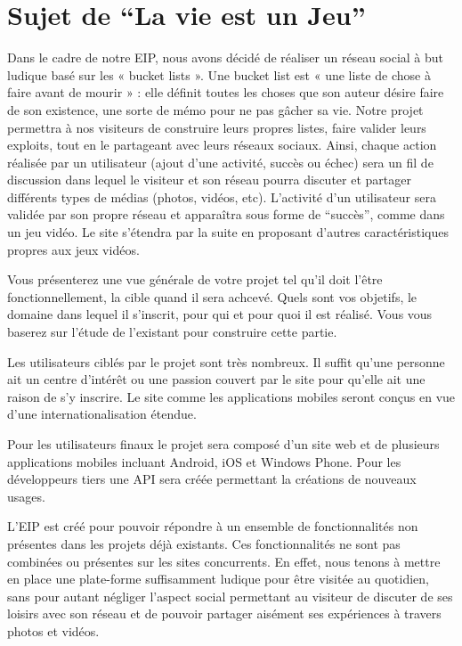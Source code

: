 \documentclass{life-fr}
\begin{document}
\section{Sujet de ``La vie est un Jeu''}
Dans le cadre de notre EIP, nous avons décidé de réaliser un réseau social à but ludique basé sur les « bucket lists ». Une bucket list est « une liste de chose à faire avant de mourir » : elle définit toutes les choses que son auteur désire faire de son existence, une sorte de mémo pour ne pas gâcher sa vie. Notre projet permettra à nos visiteurs de construire leurs propres listes, faire valider leurs exploits, tout en le partageant avec leurs réseaux sociaux. Ainsi, chaque action réalisée par un utilisateur (ajout d'une activité, succès ou échec) sera un fil de discussion dans lequel le visiteur et son réseau pourra discuter et partager différents types de médias (photos, vidéos, etc). L'activité d'un utilisateur sera validée par son propre réseau et apparaîtra sous forme de “succès”, comme dans un jeu vidéo. Le site s'étendra par la suite en proposant d'autres caractéristiques propres aux jeux vidéos.

Vous présenterez une vue générale de votre projet tel qu’il doit l’être fonctionnellement, la cible quand il sera achcevé. Quels sont vos objetifs, le domaine dans lequel il s’inscrit, pour qui et pour quoi il est réalisé. Vous vous baserez sur l’étude de l’existant pour construire cette partie.

Les utilisateurs ciblés par le projet sont très nombreux. Il suffit qu'une personne ait un centre d'intérêt ou une passion couvert par le site pour qu'elle ait une raison de s'y inscrire. Le site comme les applications mobiles seront conçus en vue d'une internationalisation étendue.

Pour les utilisateurs finaux le projet sera composé d'un site web et de plusieurs applications mobiles incluant Android, iOS et Windows Phone. Pour les développeurs tiers une API sera créée permettant la créations de nouveaux usages.

L'EIP est créé pour pouvoir répondre à un ensemble de fonctionnalités non présentes dans les projets déjà existants. Ces fonctionnalités ne sont pas combinées ou présentes sur les sites concurrents. En effet, nous tenons à mettre en place une plate-forme suffisamment ludique pour être visitée au quotidien, sans pour autant négliger l’aspect social permettant au visiteur de discuter de ses loisirs avec son réseau et de pouvoir partager aisément ses expériences à travers photos et vidéos.
\end{document}
